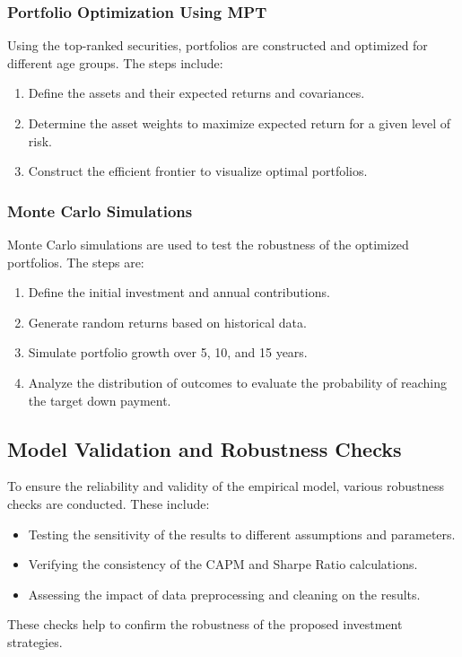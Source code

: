 \subsubsection{Portfolio Optimization Using MPT}
Using the top-ranked securities, portfolios are constructed and optimized for different age groups. The steps include:
\begin{enumerate}
    \item Define the assets and their expected returns and covariances.
    \item Determine the asset weights to maximize expected return for a given level of risk.
    \item Construct the efficient frontier to visualize optimal portfolios.
\end{enumerate}

\subsubsection{Monte Carlo Simulations}
Monte Carlo simulations are used to test the robustness of the optimized portfolios. The steps are:
\begin{enumerate}
    \item Define the initial investment and annual contributions.
    \item Generate random returns based on historical data.
    \item Simulate portfolio growth over 5, 10, and 15 years.
    \item Analyze the distribution of outcomes to evaluate the probability of reaching the target down payment.
\end{enumerate}

\subsection{Model Validation and Robustness Checks}
To ensure the reliability and validity of the empirical model, various robustness checks are conducted. These include:
\begin{itemize}
    \item Testing the sensitivity of the results to different assumptions and parameters.
    \item Verifying the consistency of the CAPM and Sharpe Ratio calculations.
    \item Assessing the impact of data preprocessing and cleaning on the results.
\end{itemize}
These checks help to confirm the robustness of the proposed investment strategies.
